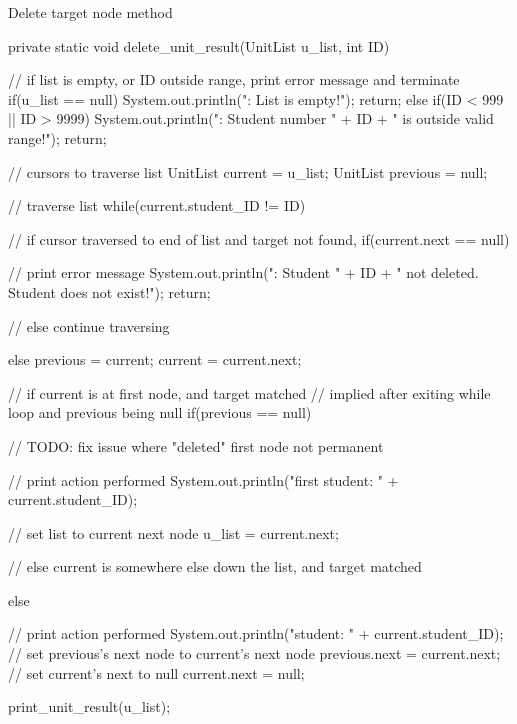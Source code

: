 \begin{listing}[H]
\caption{Delete target node method}
\begin{javacode}
private static void delete_unit_result(UnitList u_list, int ID) {

    // if list is empty, or ID outside range, print error message and terminate
    if(u_list == null) {
        System.out.println("\nError: List is empty!");
        return;
    } else if(ID < 999 || ID > 9999) {
        System.out.println("\nError: Student number " 
                + ID + " is outside valid range!");
        return;
    }

    // cursors to traverse list
    UnitList current = u_list;
    UnitList previous = null;

    // traverse list
    while(current.student_ID != ID) {

        // if cursor traversed to end of list and target not found,
        if(current.next == null) {

            // print error message
            System.out.println("\nError: Student " 
                    + ID + " not deleted. Student does not exist!");
            return;

        // else continue traversing
        } else {
            previous = current;
            current = current.next;
        }
    }

    // if current is at first node, and target matched
    // implied after exiting while loop and previous being null
    if(previous == null) {

        // TODO: fix issue where "deleted" first node not permanent

        // print action performed
        System.out.println("\nDeleted first student: " + current.student_ID);

        // set list to current next node
        u_list = current.next;

    // else current is somewhere else down the list, and target matched
    } else {

        // print action performed
        System.out.println("\nDeleted student: " + current.student_ID);
        // set previous's next node to current's next node
        previous.next = current.next;
        // set current's next to null
        current.next = null;
    }

    print_unit_result(u_list);
}
\end{javacode}
\end{listing}

